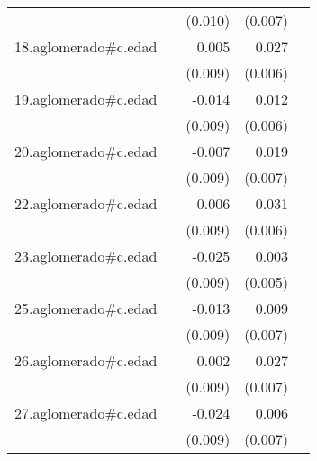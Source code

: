 {\begin{longtable}{l*{4}{D{.}{.}{-1}}}
            &                     &     (0.010)         &     (0.007)         &                     \\
\addlinespace
18.aglomerado#c.edad&                     &       0.005         &       0.027\sym{***}&                     \\
            &                     &     (0.009)         &     (0.006)         &                     \\
\addlinespace
19.aglomerado#c.edad&                     &      -0.014         &       0.012\sym{*}  &                     \\
            &                     &     (0.009)         &     (0.006)         &                     \\
\addlinespace
20.aglomerado#c.edad&                     &      -0.007         &       0.019\sym{**} &                     \\
            &                     &     (0.009)         &     (0.007)         &                     \\
\addlinespace
22.aglomerado#c.edad&                     &       0.006         &       0.031\sym{***}&                     \\
            &                     &     (0.009)         &     (0.006)         &                     \\
\addlinespace
23.aglomerado#c.edad&                     &      -0.025\sym{**} &       0.003         &                     \\
            &                     &     (0.009)         &     (0.005)         &                     \\
\addlinespace
25.aglomerado#c.edad&                     &      -0.013         &       0.009         &                     \\
            &                     &     (0.009)         &     (0.007)         &                     \\
\addlinespace
26.aglomerado#c.edad&                     &       0.002         &       0.027\sym{***}&                     \\
            &                     &     (0.009)         &     (0.007)         &                     \\
\addlinespace
27.aglomerado#c.edad&                     &      -0.024\sym{*}  &       0.006         &                     \\
            &                     &     (0.009)         &     (0.007)         &                     \\

\end{longtable}}

